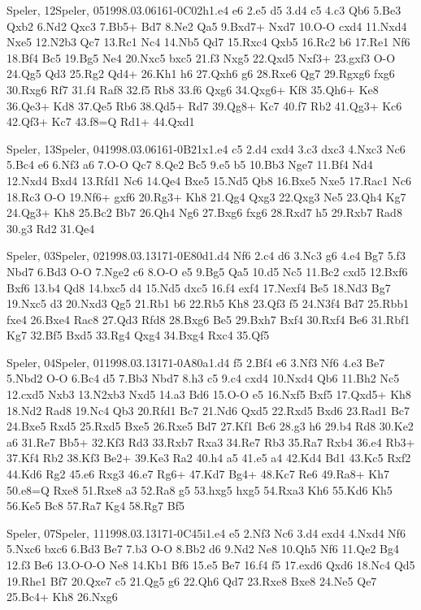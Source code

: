 \documentclass[twocolumn,a4paper,10pt]{report}
\begin{document}
\begin{chessgame}{Speler, 12}{Speler, 05}{1998.03.06}{16}{1-0}{C02h}{1.e4 e6 2.e5 d5 3.d4 c5 4.c3 Qb6 5.Be3 Qxb2 6.Nd2 Qxc3 7.Bb5+ Bd7 8.Ne2 Qa5 9.Bxd7+ Nxd7 10.O-O cxd4 11.Nxd4 Nxe5 12.N2b3 Qc7 13.Rc1 Nc4 14.Nb5 Qd7 15.Rxc4 Qxb5 16.Rc2 b6 17.Re1 Nf6 18.Bf4 Bc5 19.Bg5 Ne4 20.Nxc5 bxc5 21.f3 Nxg5 22.Qxd5 Nxf3+ 23.gxf3 O-O 24.Qg5 Qd3 25.Rg2 Qd4+ 26.Kh1 h6 27.Qxh6 g6 28.Rxe6 Qg7 29.Rgxg6 fxg6 30.Rxg6 Rf7 31.f4 Raf8 32.f5 Rb8 33.f6 Qxg6 34.Qxg6+ Kf8 35.Qh6+ Ke8 36.Qe3+ Kd8 37.Qe5 Rb6 38.Qd5+ Rd7 39.Qg8+ Kc7 40.f7 Rb2 41.Qg3+ Kc6 42.Qf3+ Kc7 43.f8=Q Rd1+ 44.Qxd1}\end{chessgame}
\begin{chessgame}{Speler, 13}{Speler, 04}{1998.03.06}{16}{1-0}{B21x}{1.e4 c5 2.d4 cxd4 3.c3 dxc3 4.Nxc3 Nc6 5.Bc4 e6 6.Nf3 a6 7.O-O Qc7 8.Qe2 Bc5 9.e5 b5 10.Bb3 Nge7 11.Bf4 Nd4 12.Nxd4 Bxd4 13.Rfd1 Nc6 14.Qe4 Bxe5 15.Nd5 Qb8 16.Bxe5 Nxe5 17.Rac1 Nc6 18.Rc3 O-O 19.Nf6+ gxf6 20.Rg3+ Kh8 21.Qg4 Qxg3 22.Qxg3 Ne5 23.Qh4 Kg7 24.Qg3+ Kh8 25.Bc2 Bb7 26.Qh4 Ng6 27.Bxg6 fxg6 28.Rxd7 h5 29.Rxb7 Rad8 30.g3 Rd2 31.Qe4}\end{chessgame}
\begin{chessgame}{Speler, 03}{Speler, 02}{1998.03.13}{17}{1-0}{E80d}{1.d4 Nf6 2.c4 d6 3.Nc3 g6 4.e4 Bg7 5.f3 Nbd7 6.Bd3 O-O 7.Nge2 c6 8.O-O e5 9.Bg5 Qa5 10.d5 Nc5 11.Bc2 cxd5 12.Bxf6 Bxf6 13.b4 Qd8 14.bxc5 d4 15.Nd5 dxc5 16.f4 exf4 17.Nexf4 Be5 18.Nd3 Bg7 19.Nxc5 d3 20.Nxd3 Qg5 21.Rb1 b6 22.Rb5 Kh8 23.Qf3 f5 24.N3f4 Bd7 25.Rbb1 fxe4 26.Bxe4 Rac8 27.Qd3 Rfd8 28.Bxg6 Be5 29.Bxh7 Bxf4 30.Rxf4 Be6 31.Rbf1 Kg7 32.Bf5 Bxd5 33.Rg4 Qxg4 34.Bxg4 Rxc4 35.Qf5}\end{chessgame}
\begin{chessgame}{Speler, 04}{Speler, 01}{1998.03.13}{17}{1-0}{A80a}{1.d4 f5 2.Bf4 e6 3.Nf3 Nf6 4.e3 Be7 5.Nbd2 O-O 6.Bc4 d5 7.Bb3 Nbd7 8.h3 c5 9.c4 cxd4 10.Nxd4 Qb6 11.Bh2 Nc5 12.cxd5 Nxb3 13.N2xb3 Nxd5 14.a3 Bd6 15.O-O e5 16.Nxf5 Bxf5 17.Qxd5+ Kh8 18.Nd2 Rad8 19.Nc4 Qb3 20.Rfd1 Bc7 21.Nd6 Qxd5 22.Rxd5 Bxd6 23.Rad1 Bc7 24.Bxe5 Rxd5 25.Rxd5 Bxe5 26.Rxe5 Bd7 27.Kf1 Bc6 28.g3 h6 29.b4 Rd8 30.Ke2 a6 31.Re7 Bb5+ 32.Kf3 Rd3 33.Rxb7 Rxa3 34.Re7 Rb3 35.Ra7 Rxb4 36.e4 Rb3+ 37.Kf4 Rb2 38.Kf3 Be2+ 39.Ke3 Ra2 40.h4 a5 41.e5 a4 42.Kd4 Bd1 43.Kc5 Rxf2 44.Kd6 Rg2 45.e6 Rxg3 46.e7 Rg6+ 47.Kd7 Bg4+ 48.Kc7 Re6 49.Ra8+ Kh7 50.e8=Q Rxe8 51.Rxe8 a3 52.Ra8 g5 53.hxg5 hxg5 54.Rxa3 Kh6 55.Kd6 Kh5 56.Ke5 Bc8 57.Ra7 Kg4 58.Rg7 Bf5}\end{chessgame}
\begin{chessgame}{Speler, 07}{Speler, 11}{1998.03.13}{17}{1-0}{C45i}{1.e4 e5 2.Nf3 Nc6 3.d4 exd4 4.Nxd4 Nf6 5.Nxc6 bxc6 6.Bd3 Be7 7.b3 O-O 8.Bb2 d6 9.Nd2 Ne8 10.Qh5 Nf6 11.Qe2 Bg4 12.f3 Be6 13.O-O-O Ne8 14.Kb1 Bf6 15.e5 Be7 16.f4 f5 17.exd6 Qxd6 18.Nc4 Qd5 19.Rhe1 Bf7 20.Qxe7 c5 21.Qg5 g6 22.Qh6 Qd7 23.Rxe8 Bxe8 24.Ne5 Qe7 25.Bc4+ Kh8 26.Nxg6\mate}\end{chessgame}
\end{document}
